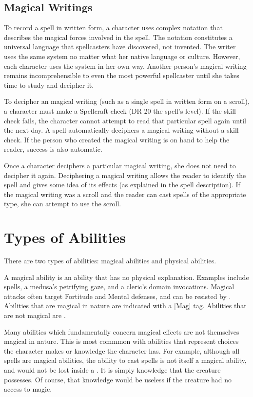     \subsection{Magical Writings}
        To record a spell in written form, a character uses complex notation that describes the magical forces involved in the spell. The notation constitutes a universal language that spellcasters have discovered, not invented. The writer uses the same system no matter what her native language or culture. However, each character uses the system in her own way. Another person's magical writing remains incomprehensible to even the most powerful spellcaster until she takes time to study and decipher it.

        To decipher an magical writing (such as a single spell in written form on a scroll), a character must make a Spellcraft check (DR 20 \add the spell's level). If the skill check fails, the character cannot attempt to read that particular spell again until the next day. A  spell automatically deciphers a magical writing without a skill check. If the person who created the magical writing is on hand to help the reader, success is also automatic.

        Once a character deciphers a particular magical writing, she does not need to decipher it again. Deciphering a magical writing allows the reader to identify the spell and gives some idea of its effects (as explained in the spell description). If the magical writing was a scroll and the reader can cast spells of the appropriate type, she can attempt to use
        the scroll.

\section{Types of Abilities}

    There are two types of abilities: magical abilities and physical abilities.

    \label{Magical Abilities} A magical ability is an ability that has no physical explanation.
    Examples include spells, a medusa's petrifying gaze, and a cleric's domain invocations.
    Magical attacks often target Fortitude and Mental defenses, and can be resisted by .
    Abilities that are magical in nature are indicated with a [Mag] tag.
    Abilities that are not magical are .

    Many abilities which fundamentally concern magical effects are not themselves magical in nature.
    This is most commmon with abilities that represent choices the character makes or knowledge the character has.
    For example, although all spells are magical abilities, the ability to cast spells is not itself a magical ability, and would not be lost inside a .
    It is simply knowledge that the creature possesses.
    Of course, that knowledge would be useless if the creature had no access to magic.


